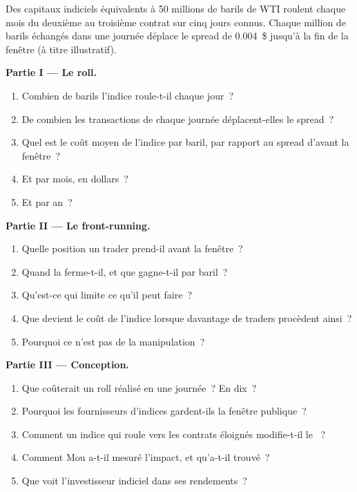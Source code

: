 \begin{problem}\label{pb:m3:forward-curves-storage-and-convenience-yield:1}
Des capitaux indiciels équivalents à 50 millions de barils de WTI roulent chaque mois du deuxième au troisième
contrat sur cinq jours connus. Chaque million de barils échangés dans une journée déplace le spread de 0.004~\$
jusqu'à la fin de la fenêtre (à titre illustratif).

\medskip\noindent\textbf{Partie I --- Le roll.}
\begin{enumerate}
\item Combien de barils l'indice roule-t-il chaque jour~?
\item De combien les transactions de chaque journée déplacent-elles le spread~?
\item Quel est le coût moyen de l'indice par baril, par rapport au spread d'avant la fenêtre~?
\item Et par mois, en dollars~?
\item Et par an~?
\end{enumerate}

\medskip\noindent\textbf{Partie II --- Le front-running.}
\begin{enumerate}[resume]
\item Quelle position un trader prend-il avant la fenêtre~?
\item Quand la ferme-t-il, et que gagne-t-il par baril~?
\item Qu'est-ce qui limite ce qu'il peut faire~?
\item Que devient le coût de l'indice lorsque davantage de traders procèdent ainsi~?
\item Pourquoi ce n'est pas de la manipulation~?
\end{enumerate}

\medskip\noindent\textbf{Partie III --- Conception.}
\begin{enumerate}[resume]
\item Que coûterait un roll réalisé en une journée~? En dix~?
\item Pourquoi les fournisseurs d'indices gardent-ils la fenêtre publique~?
\item Comment un indice qui roule vers les contrats éloignés modifie-t-il le ~?
\item Comment Mou a-t-il mesuré l'impact, et qu'a-t-il trouvé~?
\item Que voit l'investisseur indiciel dans ses rendements~?
\end{enumerate}


\end{problem}
